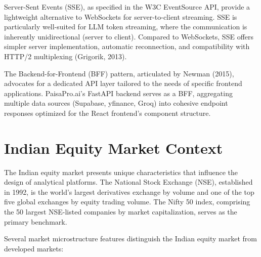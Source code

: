 \documentclass[12pt, a4paper, oneside]{report}
\newcommand{\projectname}{PaisaPro.ai}
\begin{document}
Server-Sent Events (SSE), as specified in the W3C EventSource API, provide a lightweight alternative to WebSockets for server-to-client streaming. SSE is particularly well-suited for LLM token streaming, where the communication is inherently unidirectional (server to client). Compared to WebSockets, SSE offers simpler server implementation, automatic reconnection, and compatibility with HTTP/2 multiplexing (Grigorik, 2013).

The Backend-for-Frontend (BFF) pattern, articulated by Newman (2015), advocates for a dedicated API layer tailored to the needs of specific frontend applications. \projectname{}'s FastAPI backend serves as a BFF, aggregating multiple data sources (Supabase, yfinance, Groq) into cohesive endpoint responses optimized for the React frontend's component structure.

\section{Indian Equity Market Context}
\label{sec:lit_indian_market}

The Indian equity market presents unique characteristics that influence the design of analytical platforms. The National Stock Exchange (NSE), established in 1992, is the world's largest derivatives exchange by volume and one of the top five global exchanges by equity trading volume. The Nifty 50 index, comprising the 50 largest NSE-listed companies by market capitalization, serves as the primary benchmark.

Several market microstructure features distinguish the Indian equity market from developed markets:
\end{document}
